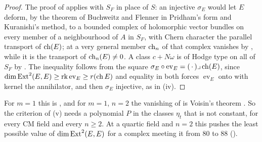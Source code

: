 \begin{proof}
The proof of  applies with $S_{F}$ in place of $S$: an
injective $\sigma_{E}$ would let $E$ deform, by the theorem of Buchweitz and
Flenner in Pridham's form and Kuranishi's method, to a bounded complex of
holomorphic vector bundles on every member of a neighbourhood of $A$ in
$S_{F}$, with Chern character the parallel transport of $\operatorname{ch}(E)$; at a very
general member $\operatorname{ch}_{n}$ of that complex vanishes by
, while it is the transport of
$\operatorname{ch}_{n}(E)\ne0$. A class $c+N\omega$ is of Hodge type on all of $S_{F}$ by
. The inequality follows from the square
$\sigma_{E}\circ\operatorname{ev}_{E}=(\,\cdot\,)\lrcorner\operatorname{ch}(E)$, since
$\dim\operatorname{Ext}^{2}(E,E)\ge\operatorname{rk}\operatorname{ev}_{E}\ge r(\operatorname{ch} E)$ and
equality in both forces $\operatorname{ev}_{E}$ onto with kernel the
annihilator, and then $\sigma_{E}$ injective, as in
(iv).
\end{proof}

For $m=1$ this is , and for $m=1$, $n=2$ the vanishing of
 is Voisin's theorem \cite[Theorem~10]{Voi02b}.
So the criterion of (v) needs a polynomial $P$ in the
classes $\eta_{t}$ that is not constant, for every CM field and every
$n\ge2$. At a quartic field and $n=2$ this pushes the least possible value of
$\dim\operatorname{Ext}^{2}(E,E)$ for a complex meeting it from $80$ to $88$
().
